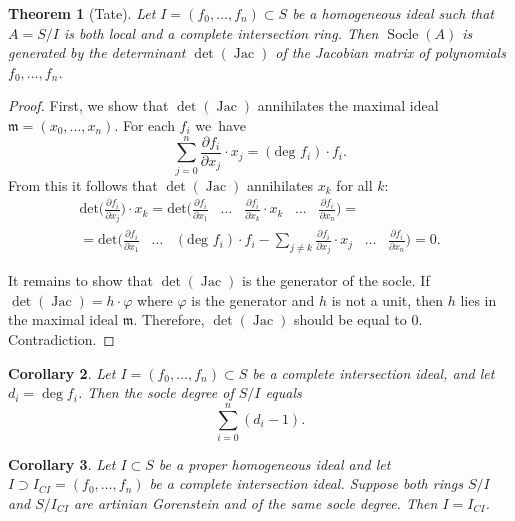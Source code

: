 \documentclass[a4paper,11pt,english,german]{amsart}
\DeclareMathOperator{\Jac}{Jac}
\DeclareMathOperator{\Socle}{Socle}
\newtheorem{thm}{Theorem}[section]
\newtheorem{cor}[thm]{Corollary}
\theoremstyle{definition}
\begin{document}
\begin{thm}[Tate]\label{tate}
Let $I=(f_0,\dots, f_n) \subset S$ be a homogeneous ideal such that $A=S/I$ is both local and a complete intersection ring. Then $\Socle(A)$ is generated by the  determinant $\det (\Jac)$ of the Jacobian matrix of polynomials $f_0,\dots, f_n$.
\end{thm}
\begin{proof}
	First, we show that $\det (\Jac)$ annihilates the maximal ideal $\mathfrak{m}=(x_0,\dots,x_n)$. For each $f_i$ we~have 
	\begin{equation*}
		\sum\limits_{j=0}^n \frac{\partial f_i}{\partial x_j} \cdot x_j=(\text{deg }f_i)\cdot f_i.
	\end{equation*}
	From this it follows that $\det (\Jac)$ annihilates $x_k$ for all $k$:
	\begin{multline*}		
	\text{det}\bigg(\frac{\partial f_i}{\partial x_j}\bigg)\cdot x_k =\text{det}\bigg(\frac{\partial f_i}{\partial x_1} \hspace{10pt} \dots \hspace{10pt} \frac{\partial f_i}{\partial x_k}\cdot x_k \hspace{10pt}\dots\hspace{10pt}\frac{\partial f_i}{\partial x_n}\bigg)=\\
	=\text{det}\bigg(\frac{\partial f_i}{\partial x_1} \hspace{10pt} \dots \hspace{10pt} (\text{deg }f_i)\cdot f_i -\sum\limits_{j\neq k}\frac{\partial f_i}{\partial x_j}\cdot x_j \hspace{10pt}\dots\hspace{10pt}\frac{\partial f_i}{\partial x_n}\bigg)=0.
	\end{multline*}
	
	It remains to show that 	$\det (\Jac)$ is the generator of the socle. If $\det (\Jac)=h\cdot \varphi$ where $\varphi$ is the generator and $h$ is not a unit, then $h$ lies in the maximal ideal $\mathfrak{m}$. Therefore, $\det (\Jac)$ should be equal to 0. Contradiction. 
\end{proof}
\begin{cor}\label{socle_degree}
	Let $I=(f_0,\dots,f_n)\subset S$ be a complete intersection ideal, and let $d_i=\deg f_i$. Then the socle degree of $S/I$ equals $$\sum\limits_{i=0}^n (d_i -1).$$
\end{cor}
\begin{cor} \label{complete_intersection_coincides_with_ideal}
	Let $I\subset S$ be a proper homogeneous ideal and let $I\supset I_{CI}=(f_0,\dots,f_n)$ be a complete intersection ideal. Suppose both rings $S/I$ and $S/I_{CI}$ are artinian Gorenstein and of the same socle degree. Then $I=I_{CI}$.
\end{cor}
\end{document}

